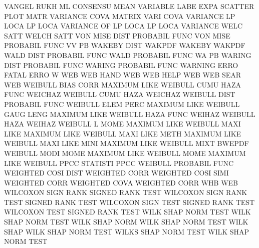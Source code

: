 VANGEL   RUKH ML                        CONSENSU MEAN
VARIABLE LABE EXPA                      SCATTER  PLOT MATR
VARIANCE COVA                           MATRIX   VARI COVA
VARIANCE LP   LOCA                      LP       LOCA
VARIANCE OF   LP   LOCA                 LP       LOCA
VARIANCE WELC SATT                      WELCH    SATT
VON      MISE DIST                      PROBABIL FUNC
VON      MISE                           PROBABIL FUNC
VV                                      PB
WAKEBY   DIST                           WAKPDF
WAKEBY                                  WAKPDF
WALD     DIST                           PROBABIL FUNC
WALD                                    PROBABIL FUNC
WA                                      PB
WARING   DIST                           PROBABIL FUNC
WARING                                  PROBABIL FUNC
WARNING  ERRO                           FATAL    ERRO
W                                       WEB
WEB      HAND                           WEB
WEB      HELP                           WEB
WEB      SEAR                           WEB
WEIBULL  BIAS CORR                      MAXIMUM  LIKE
WEIBULL  CUMU HAZA FUNC                 WEICHAZ
WEIBULL  CUMU HAZA                      WEICHAZ
WEIBULL  DIST                           PROBABIL FUNC
WEIBULL  ELEM PERC                      MAXIMUM  LIKE
WEIBULL  GAUG LENG                      MAXIMUM  LIKE
WEIBULL  HAZA FUNC                      WEIHAZ
WEIBULL  HAZA                           WEIHAZ
WEIBULL  L    MOME                      MAXIMUM  LIKE
WEIBULL  MAXI LIKE                      MAXIMUM  LIKE
WEIBULL  MAXI LIKE METH                 MAXIMUM  LIKE
WEIBULL  MAXI LIKE MINI                 MAXIMUM  LIKE
WEIBULL  MIXT                           BWEPDF
WEIBULL  MODI MOME                      MAXIMUM  LIKE
WEIBULL  MOME                           MAXIMUM  LIKE
WEIBULL  PPCC                           STATISTI PPCC
WEIBULL                                 PROBABIL FUNC
WEIGHTED COSI DIST                      WEIGHTED CORR
WEIGHTED COSI SIMI                      WEIGHTED CORR
WEIGHTED COVA                           WEIGHTED CORR
WHB                                     WEB
WILCOXON SIGN RANK                      SIGNED   RANK TEST
WILCOXON SIGN RANK TEST                 SIGNED   RANK TEST
WILCOXON SIGN TEST                      SIGNED   RANK TEST
WILCOXON TEST                           SIGNED   RANK TEST
WILK     SHAP NORM TEST                 WILK     SHAP NORM TEST
WILK     SHAP NORM                      WILK     SHAP NORM TEST
WILK     SHAP                           WILK     SHAP NORM TEST
WILKS    SHAP NORM TEST                 WILK     SHAP NORM TEST
